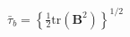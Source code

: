 \documentclass[preview]{standalone}
\begin{document}
\begin{align*}
\bar{\tau}_b = \left\{ \frac{1}{2} \text{tr}(\mathbf{B}^2) \right\}^{1/2}
\end{align*}
\end{document}
